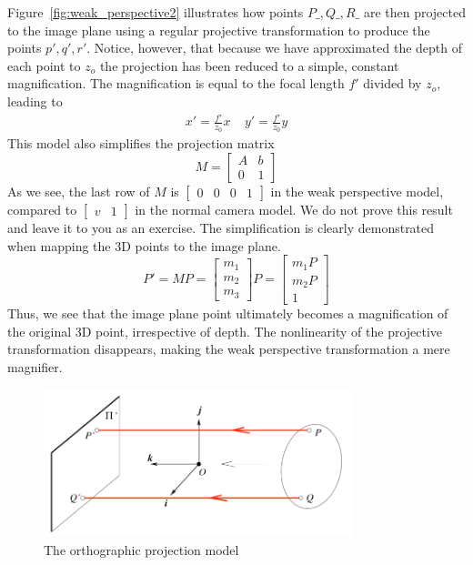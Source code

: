 \documentclass[a4paper, 12pt]{article}
\begin{document}
Figure~\ref{fig:weak_perspective2} illustrates how points $P\_, Q\_, R\_$ are then projected to the image plane using a regular projective transformation to produce the points $p', q', r'$. Notice, however, that because we have approximated the depth of each point to $z_o$ the projection has been reduced to a simple, constant magnification. The magnification is equal to the focal length $f'$ divided by $z_o$, leading to
\begin{align*}
x'=\frac{f'}{z_0}x\ \ \ \ \ 
y'=\frac{f'}{z_0}y
\end{align*}
This model also simplifies the projection matrix
\[M = \begin{bmatrix}
A & b \\ 0 & 1
\end{bmatrix}\]
As we see, the last row of $M$ is $\begin{bmatrix}
0 & 0& 0 &1
\end{bmatrix}$ in the weak perspective model, compared to $\begin{bmatrix}
v&1
\end{bmatrix}$ in the normal camera model. We do not prove this result and leave it to you as an exercise. The simplification is clearly demonstrated when mapping the 3D points to the image plane. 
\begin{equation}
    P' = MP = \begin{bmatrix}
    m_1 \\ m_2 \\ m_3
    \end{bmatrix}P = \begin{bmatrix}
    m_1P \\ m_2P \\ 1
    \end{bmatrix}
\end{equation}
Thus, we see that the image plane point ultimately becomes a magnification of the original 3D point, irrespective of depth. The nonlinearity of the projective transformation disappears, making the weak perspective transformation a mere magnifier.

\begin{figure}[h!]
\centering
\includegraphics[width=0.8\textwidth]{figures/orthographic.png}
\caption{The orthographic projection model}
\label{fig:orthographic}
\end{figure}
\end{document}
